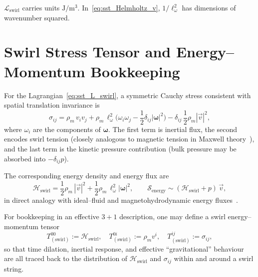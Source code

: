 \documentclass[11pt]{article}
\newcommand{\rhoM}{\rho_{\!m}}   %
\begin{document}
        \(\mathcal{L}_{\text{swirl}}\) carries units \(\mathrm{J/m^3}\). In~\eqref{eq:sst_Helmholtz_v}, \(1/\ell_\omega^{2}\) has dimensions of wavenumber squared.

    \section{Swirl Stress Tensor and Energy–Momentum Bookkeeping}
    \label{sec:sst_swirl_stress_tensor}

    For the Lagrangian~\eqref{eq:sst_L_swirl}, a symmetric Cauchy stress consistent with spatial translation invariance is~\cite{LandauFM,Morrison1998}
    \begin{equation}
        \sigma_{ij}
        =
        \rhoM\,v_i v_j
        +\rhoM\,\ell_\omega^{2}
        \Big(
        \omega_i\omega_j
        -\frac{1}{2}\delta_{ij}|\boldsymbol{\omega}|^{2}
        \Big)
        -\delta_{ij}\,\frac{1}{2}\rhoM|\vec{v}|^{2},
        \label{eq:sst_swirl_stress}
    \end{equation}
    where \(\omega_i\) are the components of \(\boldsymbol{\omega}\). The first term is inertial flux, the second encodes swirl tension (closely analogous to magnetic tension in Maxwell theory~\cite{LambHydro,Saffman1992}), and the last term is the kinetic pressure contribution (bulk pressure may be absorbed into \(-\delta_{ij}p\)).

    The corresponding energy density and energy flux are
    \begin{equation}
        \mathcal{H}_{\text{swirl}}
        =
        \frac{1}{2}\rhoM\,|\vec{v}|^{2}
        +\frac{1}{2}\rhoM\,\ell_\omega^{2}|\boldsymbol{\omega}|^{2},
        \qquad
        \bm{\mathcal{S}}_{\text{energy}}
        \sim
        (\mathcal{H}_{\text{swirl}}+p)\,\vec{v},
    \end{equation}
    in direct analogy with ideal–fluid and magnetohydrodynamic energy fluxes~\cite{LandauFM,Batchelor1967,Salmon1988}.

    For bookkeeping in an effective \(3+1\) description, one may define a swirl energy–momentum tensor
    \begin{equation}
        T^{00}_{(\text{swirl})}
        :=
        \mathcal{H}_{\text{swirl}},
        \quad
        T^{0i}_{(\text{swirl})}
        :=
        \rhoM v^i,
        \quad
        T^{ij}_{(\text{swirl})}
        :=
        \sigma_{ij},
    \end{equation}
    so that time dilation, inertial response, and effective “gravitational” behaviour are all traced back to the distribution of \(\mathcal{H}_{\text{swirl}}\) and \(\sigma_{ij}\) within and around a swirl string.
\end{document}
